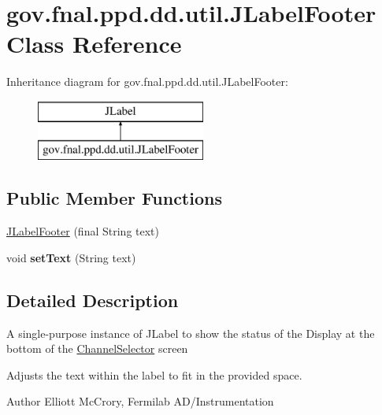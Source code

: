 \hypertarget{classgov_1_1fnal_1_1ppd_1_1dd_1_1util_1_1JLabelFooter}{\section{gov.\-fnal.\-ppd.\-dd.\-util.\-J\-Label\-Footer Class Reference}
\label{classgov_1_1fnal_1_1ppd_1_1dd_1_1util_1_1JLabelFooter}
}
Inheritance diagram for gov.\-fnal.\-ppd.\-dd.\-util.\-J\-Label\-Footer\-:\begin{figure}[H]
\begin{center}
\leavevmode
\includegraphics[height=2.000000cm]{classgov_1_1fnal_1_1ppd_1_1dd_1_1util_1_1JLabelFooter}
\end{center}
\end{figure}
\subsection*{Public Member Functions}
\begin{DoxyCompactItemize}
\item 
\hyperlink{classgov_1_1fnal_1_1ppd_1_1dd_1_1util_1_1JLabelFooter_ab4537cd908aa02ec862e7bc068803aef}{J\-Label\-Footer} (final String text)
\item 
\hypertarget{classgov_1_1fnal_1_1ppd_1_1dd_1_1util_1_1JLabelFooter_ab7c60651bcbb172b880fcdc0bf0107b8}{void {\bfseries set\-Text} (String text)}\label{classgov_1_1fnal_1_1ppd_1_1dd_1_1util_1_1JLabelFooter_ab7c60651bcbb172b880fcdc0bf0107b8}

\end{DoxyCompactItemize}


\subsection{Detailed Description}
A single-\/purpose instance of J\-Label to show the status of the Display at the bottom of the \hyperlink{classgov_1_1fnal_1_1ppd_1_1dd_1_1ChannelSelector}{Channel\-Selector} screen

Adjusts the text within the label to fit in the provided space.

\begin{DoxyAuthor}{Author}
Elliott Mc\-Crory, Fermilab A\-D/\-Instrumentation 
\end{DoxyAuthor}


